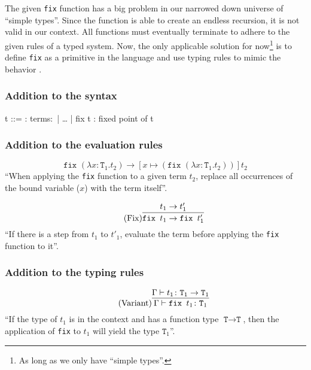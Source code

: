 The given \texttt{fix} function has a big problem in our narrowed down universe
of ``simple types''. Since the function is able to create an endless recursion,
it is not valid in our context. All functions must eventually terminate to adhere
to the given rules of a typed system. Now, the only applicable solution for
now\footnote{As long as we only have ``simple types''.} is to define \texttt{fix}
as a primitive in the language and use typing rules to mimic the behavior
\cite{pierce2002ProgLang}.

\subsubsection{Addition to the syntax \cite{pierce2002ProgLang}}
\begin{bnfgrammar}
    t ::= : terms$\colon$
    | \dots
    | fix t : fixed point of t
\end{bnfgrammar}\leavevmode\newline

\subsubsection{Addition to the evaluation rules \cite{pierce2002ProgLang}}
\begin{equation*}
    \tag{Fix Beta Reduction}
    \texttt{fix } (\lambda x \colon \texttt{T}_1 . t_2)
    \rightarrow
    [x \mapsto (\texttt{fix } (\lambda x \colon \texttt{T}_1 . t_2 ))]t_2
\end{equation*}
``When applying the \texttt{fix} function to a given term $t_2$,
replace all occurrences of the bound variable ($x$) with the
term itself''.

\begin{equation*}
    \tag{Fix}
    \infer{
        \texttt{fix } t_1 \rightarrow \texttt{fix } t'_1
    }{
        t_1 \rightarrow t'_1
    }
\end{equation*}
``If there is a step from $t_1$ to $t'_1$, evaluate the term
before applying the \texttt{fix} function to it''.

\subsubsection{Addition to the typing rules \cite{pierce2002ProgLang}}
\begin{equation*}
    \tag{Variant}
    \infer{
        \Gamma \vdash \texttt{fix } t_1 \colon \texttt{T}_1
    }{
        \Gamma \vdash t_1 \colon \texttt{T}_1 \rightarrow \texttt{T}_1
    }
\end{equation*}
``If the type of $t_1$ is in the context and has a function type
$\texttt{T} \rightarrow \texttt{T}$, then the application of
\texttt{fix} to $t_1$ will yield the type $\texttt{T}_1$''.

